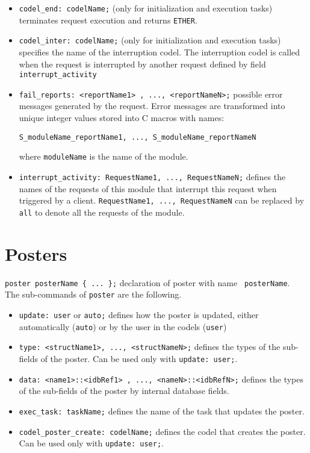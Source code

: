 \begin{itemize}
\item[]{\tt codel\_end:  codelName;} (only for initialization and execution
tasks) terminates request execution and returns {\tt ETHER}.

\item[]{\tt codel\_inter: codelName;} (only for initialization and execution
tasks) specifies the name of the interruption codel. The interruption
codel is called when the request is interrupted by another request
defined by field {\tt interrupt\_activity}\\

\item[]{\tt fail\_reports:  <reportName1> , ..., <reportNameN>;}
possible error messages generated by the request. Error messages are
transformed into unique integer values stored into C macros with
names:
\begin{verbatim}
S_moduleName_reportName1, ..., S_moduleName_reportNameN
\end{verbatim}
where \texttt{moduleName} is the name of the module.

\item[]{\tt interrupt\_activity:	    RequestName1, ..., RequestNameN;}
defines the names of the requests of this module that interrupt this request when
triggered by a client. {\tt RequestName1, ..., RequestNameN} can be
replaced by {\tt all} to denote all the requests of the module.

\end{itemize}

\section{Posters}
\label{sec|posters}

{\tt poster posterName \{ ... \};} declaration of poster with name {\tt
  posterName}.\\

\noindent
The sub-commands of {\tt poster} are the following.

\begin{itemize}
\item[]{\tt update:  user} or {\tt auto;} defines how the poster is updated,
either automatically ({\tt auto}) or by the user in the codels ({\tt user})

\item[]{\tt type:  <structName1>, ..., <structNameN>;} defines the types of
the sub-fields of the poster. Can be used only with {\tt update:  user;}.

\item[]{\tt data:  <name1>::<idbRef1> , ..., <nameN>::<idbRefN>;} defines the
types of the sub-fields of the poster by internal database fields.

\item[]{\tt exec\_task:  taskName;} defines the name of the task that updates
the poster.

\item[]{\tt codel\_poster\_create:  codelName;} defines the codel that creates
the poster. Can be used only with {\tt update:  user;}.
\end{itemize}

